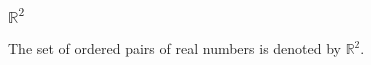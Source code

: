 \begin{frame}
\frametitle{$\mathbb R^2$}
\begin{definition}
The set of ordered pairs of real numbers is denoted by $\mathbb R^2$.
\end{definition}
\end{frame}